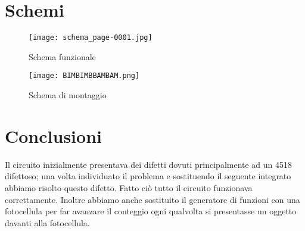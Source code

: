 \documentclass[a4paper, 10pt]{RelazioneLab}
\begin{document}
\section{Schemi}
\begin{figure}[H]
    \centering
    \texttt{[image: schema\_page-0001.jpg]}
    \caption{Schema funzionale}
    \label{fig:enter-label}
\end{figure}
\begin{figure}[H]
    \centering
    \texttt{[image: BIMBIMBBAMBAM.png]}
    \caption{Schema di montaggio}
    \label{fig:enter-label}
\end{figure}
\section{Conclusioni}
Il circuito inizialmente presentava dei difetti dovuti principalmente ad un 4518 difettoso; una volta individuato il problema e sostituendo il seguente integrato abbiamo risolto questo difetto. Fatto ciò tutto il circuito funzionava correttamente. Inoltre abbiamo anche sostituito il generatore di funzioni con una fotocellula per far avanzare il conteggio ogni qualvolta si presentasse un oggetto davanti alla fotocellula. 
\end{document}
